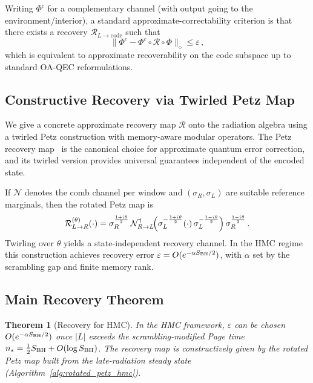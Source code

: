 \documentclass[a4paper,11pt]{article}
\newcommand{\HMC}{\textup{\textsc{HMC}}\xspace}
\theoremstyle{plain}
\newtheorem{theorem}{Theorem}
\theoremstyle{definition}
\theoremstyle{remark}
\begin{document}
Writing $\Phi^{c}$ for a complementary channel (with output going to the environment/interior), a standard approximate-correctability criterion is that there exists a recovery $\mathcal{R}_{L\to \mathrm{code}}$ such that
\begin{equation}
\bigl\| \Phi^{c} - \Phi^{c}\circ \mathcal{R}\circ \Phi \bigr\|_{\diamond} \le \varepsilon\,,
\end{equation}
which is equivalent to approximate recoverability on the code subspace up to standard OA-QEC reformulations.

\subsection{Constructive Recovery via Twirled Petz Map}
We give a concrete approximate recovery map $\mathcal{R}$ onto the radiation algebra using a twirled Petz construction with memory-aware modular operators. The Petz recovery map~\cite{Petz:1986} is the canonical choice for approximate quantum error correction, and its twirled version provides universal guarantees independent of the encoded state.

If $\mathcal{N}$ denotes the comb channel per window and $(\sigma_R,\sigma_L)$ are suitable reference marginals, then the rotated Petz map is
\begin{align}
\mathcal{R}^{(\theta)}_{L\to R}(\cdot)
=
\sigma_R^{\frac{1+i\theta}{2}}\,
\mathcal{N}_{R\to L}^{\dagger}\!\Bigl(
\sigma_L^{-\frac{1+i\theta}{2}}
(\cdot)\,
\sigma_L^{-\frac{1-i\theta}{2}}
\Bigr)\,
\sigma_R^{\frac{1-i\theta}{2}}\,.
\end{align}
Twirling over $\theta$ yields a state-independent recovery channel. In the \HMC{} regime this construction achieves recovery error $\varepsilon=O(e^{-\alpha S_{\rm BH}/2})$, with $\alpha$ set by the scrambling gap and finite memory rank.

\subsection{Main Recovery Theorem}
\begin{theorem}[Recovery for \HMC{}]\label{thm:hmc_recovery}
In the \HMC{} framework, $\varepsilon$ can be chosen $O(e^{-\alpha S_{\rm BH}/2})$ once $|L|$ exceeds the scrambling-modified Page time $n_* = \frac{1}{2}S_{\rm BH} + O(\log S_{\rm BH})$. The recovery map is constructively given by the rotated Petz map built from the late-radiation steady state (Algorithm~\ref{alg:rotated_petz_hmc}).
\end{theorem}
\end{document}
